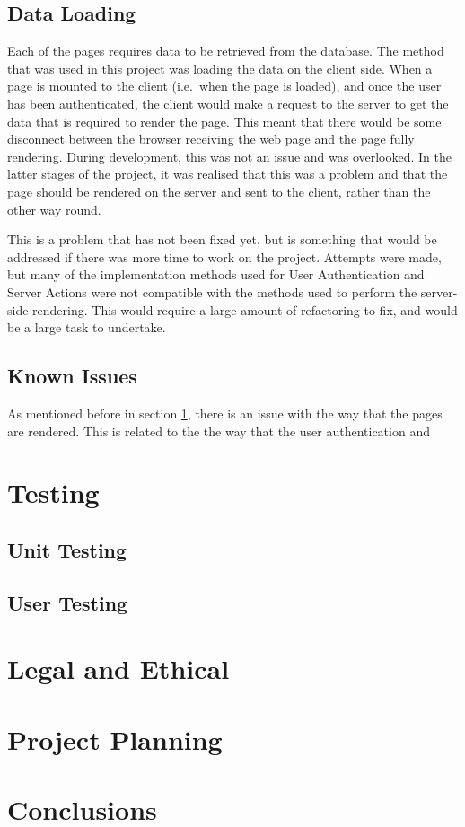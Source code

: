 \documentclass[12pt, a4paper,twoside]{report}
\theoremstyle{plain} %
\theoremstyle{definition} %
\numberwithin{equation}{chapter}
\begin{document}
\section{Data Loading}\label{sec:dataloading}

Each of the pages requires data to be retrieved from the database. The method that was
used in this project was loading the data on the client side. When a page is mounted to
the client (i.e.\ when the page is loaded), and once the user has been authenticated, the
client would make a request to the server to get the data that is required to render the
page. This meant that there would be some disconnect between the browser receiving the web
page and the page fully rendering. During development, this was not an issue and was
overlooked. In the latter stages of the project, it was realised that this was a problem
and that the page should be rendered on the server and sent to the client, rather than
the other way round.

This is a problem that has not been fixed yet, but is something that would be addressed
if there was more time to work on the project. Attempts were made, but many of the
implementation methods used for User Authentication and Server Actions were not compatible
with the methods used to perform the server-side rendering. This would require a large
amount of refactoring to fix, and would be a large task to undertake.

\section{Known Issues}\label{sec:knownissues}

As mentioned before in section \ref{sec:dataloading}, there is an issue with the way that
the pages are rendered. This is related to the the way that the user authentication and


\chapter{Testing}\label{ch:testing}

\section{Unit Testing}\label{sec:unittesting}

\section{User Testing}\label{sec:usertesting}

\chapter{Legal and Ethical}\label{ch:legalandethical}

\chapter{Project Planning}\label{ch:projectplanning}

\chapter{Conclusions}\label{ch:conclusion}



\end{document}
